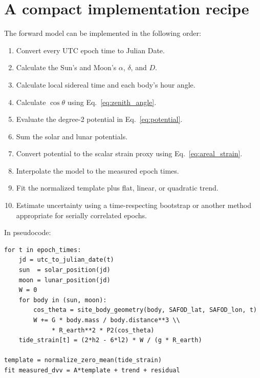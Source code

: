 \documentclass[11pt]{article}
\begin{document}
\section{A compact implementation recipe}

The forward model can be implemented in the following order:

\begin{enumerate}
  \item Convert every UTC epoch time to Julian Date.
  \item Calculate the Sun’s and Moon’s $\alpha$, $\delta$, and $D$.
  \item Calculate local sidereal time and each body’s hour angle.
  \item Calculate $\cos\theta$ using Eq.~\eqref{eq:zenith_angle}.
  \item Evaluate the degree-2 potential in Eq.~\eqref{eq:potential}.
  \item Sum the solar and lunar potentials.
  \item Convert potential to the scalar strain proxy using Eq.~\eqref{eq:areal_strain}.
  \item Interpolate the model to the measured epoch times.
  \item Fit the normalized template plus flat, linear, or quadratic trend.
  \item Estimate uncertainty using a time-respecting bootstrap or another
        method appropriate for serially correlated epochs.
\end{enumerate}

In pseudocode:

\begin{verbatim}
for t in epoch_times:
    jd = utc_to_julian_date(t)
    sun  = solar_position(jd)
    moon = lunar_position(jd)
    W = 0
    for body in (sun, moon):
        cos_theta = site_body_geometry(body, SAFOD_lat, SAFOD_lon, t)
        W += G * body.mass / body.distance**3 \\
             * R_earth**2 * P2(cos_theta)
    tide_strain[t] = (2*h2 - 6*l2) * W / (g * R_earth)

template = normalize_zero_mean(tide_strain)
fit measured_dvv = A*template + trend + residual
\end{verbatim}

\end{document}
